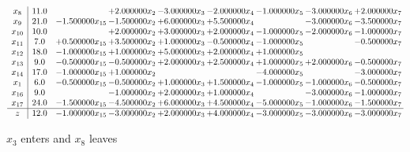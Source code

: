 \documentclass[10pt]{article}
\begin{document}
 \[\begin{array}{c| c c@{\hskip 2pt} c@{\hskip 2pt} c@{\hskip 2pt} c@{\hskip 2pt} c@{\hskip 2pt} c@{\hskip 2pt} c@{\hskip 2pt} }
 x_{8}   &  11.0  &   & + 2.000000 x_{2} & -3.000000 x_{3} & -2.000000 x_{4} & -1.000000 x_{5} & -3.000000 x_{6} & + 2.000000 x_{7}\\
 x_{9}   &  21.0 & -1.500000 x_{15} & -1.500000 x_{2} & + 6.000000 x_{3} & + 5.500000 x_{4} &   & -3.000000 x_{6} & -3.500000 x_{7}\\
 x_{10}   &  10.0  &   & + 2.000000 x_{2} & + 3.000000 x_{3} & + 2.000000 x_{4} & -1.000000 x_{5} & -2.000000 x_{6} & -1.000000 x_{7}\\
 x_{11}   &  7.0 & + 0.500000 x_{15} & + 3.500000 x_{2} & + 1.000000 x_{3} & -0.500000 x_{4} & -1.000000 x_{5} &   & -0.500000 x_{7}\\
 x_{12}   &  18.0 & -1.000000 x_{15} & + 1.000000 x_{2} & + 5.000000 x_{3} & + 2.000000 x_{4} & + 1.000000 x_{5} &    &   \\
 x_{13}   &  9.0 & -0.500000 x_{15} & -0.500000 x_{2} & + 2.000000 x_{3} & + 2.500000 x_{4} & + 1.000000 x_{5} & + 2.000000 x_{6} & -0.500000 x_{7}\\
 x_{14}   &  17.0 & -1.000000 x_{15} & + 1.000000 x_{2} &    &   & -4.000000 x_{5} &   & -3.000000 x_{7}\\
 x_{1}   &  6.0 & -0.500000 x_{15} & -0.500000 x_{2} & + 1.000000 x_{3} & + 1.500000 x_{4} & -1.000000 x_{5} & -1.000000 x_{6} & -0.500000 x_{7}\\
 x_{16}   &  9.0  &   & -1.000000 x_{2} & + 2.000000 x_{3} & + 1.000000 x_{4} &   & -3.000000 x_{6} & -1.000000 x_{7}\\
 x_{17}   &  24.0 & -1.500000 x_{15} & -4.500000 x_{2} & + 6.000000 x_{3} & + 4.500000 x_{4} & -5.000000 x_{5} & -1.000000 x_{6} & -1.500000 x_{7}\\
\hline
z    &  12.0 & -1.000000 x_{15} & -3.000000 x_{2} & + 2.000000 x_{3} & + 4.000000 x_{4} & -3.000000 x_{5} & -3.000000 x_{6} & -3.000000 x_{7}\\
\end{array}\]


 $ x_{3} $ enters and $ x_{8} $ leaves 
\end{document}
